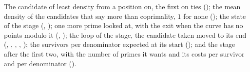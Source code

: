 \begin{definition}\label{def:thirdStage}
  \leanok
  The candidate of least density from a position on, the first on ties
  (); the mean density of the candidates that say more than
  coprimality, $1$ for none (); the state of the stage
  (, ); one more prime looked
  at, with the exit when the curve has no points modulo it (,
  ); the loop of the stage, the candidate taken moved to its end
  (, ,
  , ,
  ); the survivors per denominator expected at its start
  (); and the stage after the first two, with the number of
  primes it wants and its costs per survivor and per denominator
  ().
\end{definition}

